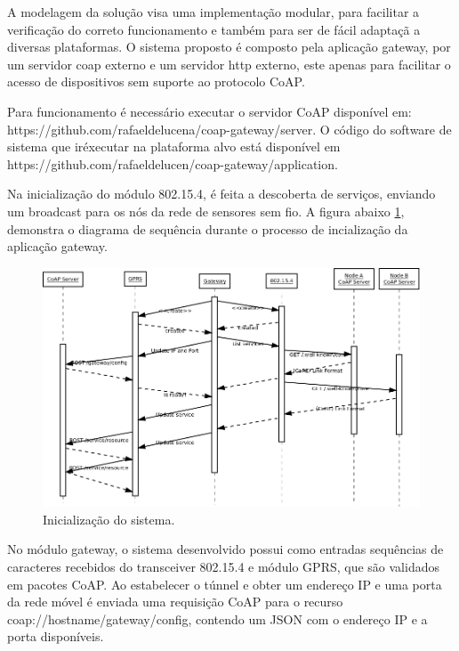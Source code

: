 A modelagem da solu\c{c}\~ao visa uma implementa\c{c}\~ao modular, para facilitar a verifica\c{c}\~ao do correto funcionamento e tamb\'em para ser de f\'acil adapta\c{c}\~a a diversas plataformas. O sistema proposto \'e composto pela aplica\c{c}\~ao gateway, por um servidor coap externo e um servidor http externo, este apenas para facilitar o acesso de dispositivos sem suporte ao protocolo CoAP.

Para funcionamento \'e necess\'ario executar o servidor CoAP dispon\'ivel em: https://github.com/rafaeldelucena/coap-gateway/server. O c\'odigo do software de sistema que ir\' executar na plataforma alvo est\'a dispon\'ivel em https://github.com/rafaeldelucen/coap-gateway/application.

Na inicializa\c{c}\~ao do m\'odulo 802.15.4, \'e feita a descoberta de servi\c{c}os, enviando um broadcast para os n\'os da rede de sensores sem fio. A figura abaixo \ref{onStartup}, demonstra o diagrama de sequ\^encia durante o processo de incializa\c{c}\~ao da aplica\c{c}\~ao gateway.  

\begin{figure}[H]
   \centering
   \includegraphics[width=1.0\textwidth]{figuras/umlOnStartup.png}
   \caption{Inicializa\c{c}\~ao do sistema.}
   \label{onStartup}
\end{figure}

No m\'odulo gateway, o sistema desenvolvido possui como entradas sequ\^encias de caracteres recebidos do transceiver 802.15.4 e m\'odulo GPRS, que s\~ao validados em pacotes CoAP. Ao estabelecer o t\'unnel e obter um endere\c{c}o IP e uma porta da rede m\'ovel \'e enviada uma requisi\c{c}\~ao CoAP para o recurso coap://hostname/gateway/config, contendo um JSON com o endere\c{c}o IP e a porta dispon\'iveis.

